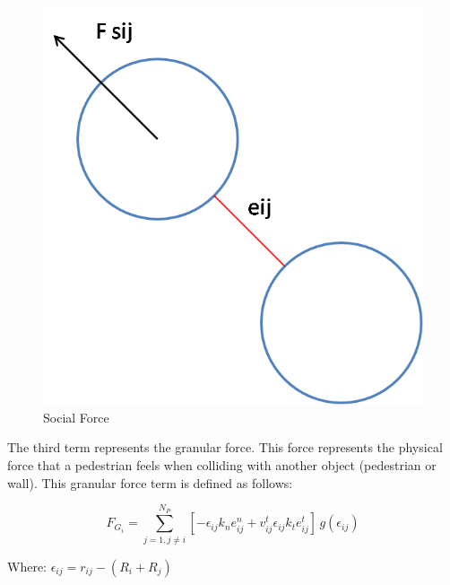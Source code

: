 \documentclass[english]{article}
\numberwithin{equation}{section}
\numberwithin{figure}{section}
\begin{document}
\begin{figure}[H]
\begin{centering}
\includegraphics[scale=0.4]{pics/sfm/sf}
\par\end{centering}

\protect\caption{Social Force}
\end{figure}


\vspace{1cm}


The third term represents the granular force. This force represents
the physical force that a pedestrian feels when colliding with
another object (pedestrian or wall). This granular force term is
defined as follows:

\[
F_{G_{i}}=\sum_{j=1,j\ne i}^{N_{P}}[-\epsilon_{ij}k_{n}e_{ij}^{n}+v_{ij}^{t}\epsilon_{ij}k_{t}e_{ij}^{t}]\, g(\epsilon_{ij})
\]


Where: $\epsilon_{ij}=r_{ij}-(R_{i}+R_{j})$
\end{document}
